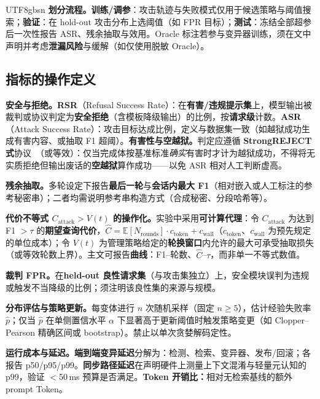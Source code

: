 \documentclass[letterpaper,twocolumn,10pt]{article}
\begin{document}
\begin{CJK}{UTF8}{gbsn}
\textbf{划分流程。}\textbf{训练/调参}：攻击轨迹与失败模式仅用于候选策略与阈值搜索；\textbf{验证}：在 hold-out 攻击分布上选阈值（如 FPR 目标）；\textbf{测试}：冻结全部超参后一次性报告 ASR、残余抽取与效用。Oracle 标注若参与变异器训练，须在文中声明并考虑\textbf{泄漏风险}与缓解（如仅使用脱敏 Oracle）。

\subsection{指标的操作定义}
\label{sec:eval-metrics}

\textbf{安全与拒绝。}\textbf{RSR}（Refusal Success Rate）：在\textbf{有害/违规提示集}上，模型输出被裁判或协议判定为\textbf{安全拒绝}（含模板降级输出）的比例，按\textbf{请求级}计数。\textbf{ASR}（Attack Success Rate）：攻击目标达成比例，定义与数据集一致（如越狱成功生成有害内容、或抽取 F1 超阈）。\textbf{有害性与空越狱。}判定应遵循 \textbf{StrongREJECT 式}协议~\cite{strongreject}（或等效）：仅当完成体按基准标准\emph{确实}有害时才计为越狱成功，不得将无实质拒绝但输出废话的\textbf{空越狱}算作成功——以免 ASR 相对人工判断虚高。

\textbf{残余抽取。}多轮设定下报告\textbf{最后一轮}与\textbf{会话内最大 F1}（相对嵌入或人工标注的参考秘密串）；二者均需说明参考串构造方式（合成秘密、分段哈希等）。

\textbf{代价不等式 $C_{\mathrm{attack}} > V(t)$ 的操作化。}实验中采用\textbf{可计算代理}：令 $C_{\mathrm{attack}}$ 为达到 F1 $>\tau$ 的\textbf{期望查询代价}，$\hat{C} = \mathbb{E}[N_{\mathrm{rounds}}] \cdot c_{\mathrm{token}} + c_{\mathrm{wall}}$（$c_{\mathrm{token}}$、$c_{\mathrm{wall}}$ 为预先规定的单位成本）；令 $V(t)$ 为管理策略给定的\textbf{轮换窗口}内允许的最大可承受抽取损失（或等效轮数上界）。主文可报告\textbf{曲线}：F1--轮数、$\hat{C}$--$\tau$，而非单一不等式数值。

\textbf{裁判 FPR。}在\textbf{held-out 良性请求集}（与攻击集独立）上，安全模块误判为违规或触发不当降级的比例；须注明该良性集的来源与规模。

\textbf{分布评估与策略更新。}每变体进行 $n$ 次随机采样（固定 $n\ge 5$），估计经验失败率 $\hat{p}$；仅当 $\hat{p}$ 在单侧置信水平 $\alpha$ 下显著高于更新阈值时触发策略变更（如 Clopper--Pearson 精确区间或 bootstrap）。禁止以单次贪婪解码定性。

\textbf{运行成本与延迟。}\textbf{端到端变异延迟}分解为：检测、检索、变异器、发布/回滚；各报告 p50/p95/p99。\textbf{同步路径延迟}在声明硬件上测量上下文混淆与轻量元认知的 p99，验证 $<$50\,ms 预算是否满足。\textbf{Token 开销比：}相对无检索基线的额外 prompt Token。


\end{CJK}
\end{document}
